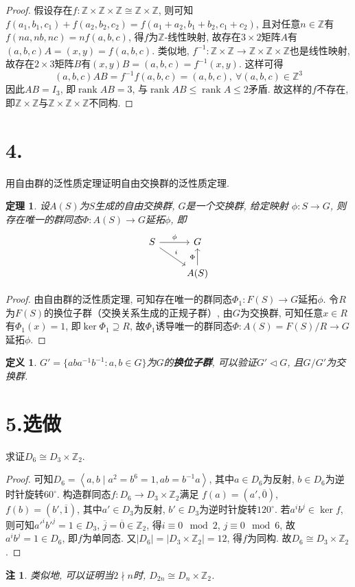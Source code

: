 \documentclass[12pt, a4paper, fontset=windows]{ctexart}
\newcommand{\Z}{\mathbb{Z}}
\newcommand{\abs}[1]{\left|{#1}\right|}
\newcommand{\cl}[1]{\overline{#1}} %
\newcommand{\gen}[1]{\left\langle{#1}\right\rangle}
\newcommand{\isom}{\cong} %
\newcommand{\kh}[1]{（{#1}）} %
\newcommand{\rank}{\operatorname{rank}}
\newcommand{\xuan}{{\normalsize 选做}}
\newtheorem*{definition}{定义}
\newtheorem*{remark}{注}
\newtheorem*{theorem}{定理}
\begin{document}
{\begin{proof}
假设存在$f:\Z\times\Z\times\Z\isom\Z\times\Z$, 
则可知$f(a_1,b_1,c_1)+f(a_2,b_2,c_2)=f(a_1+a_2,b_1+b_2,c_1+c_2)$, 
且对任意$n\in\Z$有$f(na,nb,nc)=nf(a,b,c)$, 得$f$为$\Z$-线性映射, 
故存在$3\times 2$矩阵$A$有$(a,b,c)A=(x,y)=f(a,b,c)$. 
类似地, $f^{-1}:\Z\times\Z\to\Z\times\Z\times\Z$也是线性映射, 
故存在$2\times 3$矩阵$B$有$(x,y)B=(a,b,c)=f^{-1}(x,y)$. 这样可得
\[(a,b,c)AB=f^{-1}f(a,b,c)=(a,b,c),\ \forall(a,b,c)\in\Z^3\]
因此$AB=I_3$, 即$\rank AB=3$, 与$\rank AB\le\rank A\le 2$矛盾. 
故这样的$f$不存在, 即$\Z\times\Z$与$\Z\times\Z\times\Z$不同构. 
\end{proof}

\section*{4.}

用自由群的泛性质定理证明自由交换群的泛性质定理. 

\begin{theorem}
设$A(S)$为$S$生成的自由交换群, $G$是一个交换群, 给定映射
$\phi:S\to G$, 则存在唯一的群同态$\Phi:A(S)\to G$延拓$\phi$, 即
\[\begin{tikzcd}
S\ar[r,"\phi"]\ar[rd,"i"]&G\\
&A(S)\ar[u,"\Phi"]
\end{tikzcd}\]
\end{theorem}

\begin{proof}
由自由群的泛性质定理, 可知存在唯一的群同态$\Phi_1:F(S)\to G$延拓$\phi$. 
令$R$为$F(S)$的换位子群\kh{交换关系生成的正规子群}, 由$G$为交换群, 可知任意$x\in R$有$\Phi_1(x)=1$, 
即$\ker\Phi_1\supseteq R$, 故$\Phi_1$诱导唯一的群同态$\Phi:A(S)=F(S)/R\to G$延拓$\phi$. 
\end{proof}

\begin{definition}
$G'=\{aba^{-1}b^{-1}:a,b\in G\}$为$G$的{\bf 换位子群}, 
可以验证$G'\lhd G$, 且$G/G'$为交换群. 
\end{definition}

\section*{5.\xuan}

求证$D_6\isom D_3\times\Z_2$. 

\begin{proof}
可知$D_6=\gen{a,b\mid a^2=b^6=1,ab=b^{-1}a}$, 其中$a\in D_6$为反射, 
$b\in D_6$为逆时针旋转$60^\circ$. 构造群同态$f:D_6\to D_3\times\Z_2$满足
$f(a)=(a',\cl{0})$, $f(b)=(b',\cl{1})$, 
其中$a'\in D_3$为反射, $b'\in D_3$为逆时针旋转$120^\circ$. 
若$a^ib^j\in\ker f$, 则可知$a'^ib'^j=1\in D_3$, 
$\cl{j}=\cl{0}\in\Z_2$, 得$i\equiv 0\mod 2$, $j\equiv 0\mod 6$, 
故$a^ib^j=1\in D_6$, 即$f$为单同态. 又$\abs{D_6}=\abs{D_3\times\Z_2}=12$, 
得$f$为同构. 故$D_6\isom D_3\times\Z_2$. 
\end{proof}

\begin{remark}
类似地, 可以证明当$2\nmid n$时, $D_{2n}\isom D_n\times\Z_2$. 
\end{remark}
}
\clearpage
\end{document}
